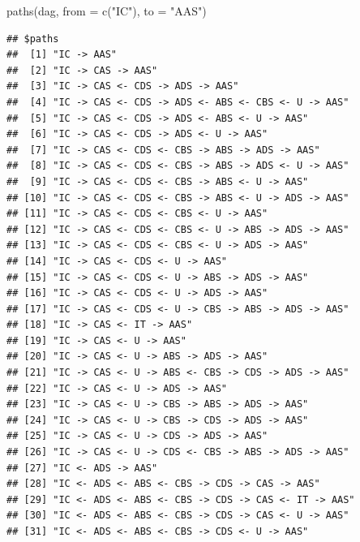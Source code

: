 \documentclass[
  10pt,
  dvipsnames, enabledeprecatedfontcommands]{scrartcl}
\newenvironment{Shaded}{\begin{snugshade}}{\end{snugshade}}
\newcommand{\AttributeTok}[1]{\textcolor[rgb]{0.77,0.63,0.00}{#1}}
\newcommand{\FunctionTok}[1]{\textcolor[rgb]{0.00,0.00,0.00}{#1}}
\newcommand{\NormalTok}[1]{#1}
\newcommand{\StringTok}[1]{\textcolor[rgb]{0.31,0.60,0.02}{#1}}
\begin{document}
\vspace{1mm}
\footnotesize

\begin{Shaded}
\begin{Highlighting}[]
\FunctionTok{paths}\NormalTok{(dag, }\AttributeTok{from =} \FunctionTok{c}\NormalTok{(}\StringTok{"IC"}\NormalTok{), }\AttributeTok{to =} \StringTok{"AAS"}\NormalTok{)}
\end{Highlighting}
\end{Shaded}

\begin{verbatim}
## $paths
##  [1] "IC -> AAS"                                              
##  [2] "IC -> CAS -> AAS"                                       
##  [3] "IC -> CAS <- CDS -> ADS -> AAS"                         
##  [4] "IC -> CAS <- CDS -> ADS <- ABS <- CBS <- U -> AAS"      
##  [5] "IC -> CAS <- CDS -> ADS <- ABS <- U -> AAS"             
##  [6] "IC -> CAS <- CDS -> ADS <- U -> AAS"                    
##  [7] "IC -> CAS <- CDS <- CBS -> ABS -> ADS -> AAS"           
##  [8] "IC -> CAS <- CDS <- CBS -> ABS -> ADS <- U -> AAS"      
##  [9] "IC -> CAS <- CDS <- CBS -> ABS <- U -> AAS"             
## [10] "IC -> CAS <- CDS <- CBS -> ABS <- U -> ADS -> AAS"      
## [11] "IC -> CAS <- CDS <- CBS <- U -> AAS"                    
## [12] "IC -> CAS <- CDS <- CBS <- U -> ABS -> ADS -> AAS"      
## [13] "IC -> CAS <- CDS <- CBS <- U -> ADS -> AAS"             
## [14] "IC -> CAS <- CDS <- U -> AAS"                           
## [15] "IC -> CAS <- CDS <- U -> ABS -> ADS -> AAS"             
## [16] "IC -> CAS <- CDS <- U -> ADS -> AAS"                    
## [17] "IC -> CAS <- CDS <- U -> CBS -> ABS -> ADS -> AAS"      
## [18] "IC -> CAS <- IT -> AAS"                                 
## [19] "IC -> CAS <- U -> AAS"                                  
## [20] "IC -> CAS <- U -> ABS -> ADS -> AAS"                    
## [21] "IC -> CAS <- U -> ABS <- CBS -> CDS -> ADS -> AAS"      
## [22] "IC -> CAS <- U -> ADS -> AAS"                           
## [23] "IC -> CAS <- U -> CBS -> ABS -> ADS -> AAS"             
## [24] "IC -> CAS <- U -> CBS -> CDS -> ADS -> AAS"             
## [25] "IC -> CAS <- U -> CDS -> ADS -> AAS"                    
## [26] "IC -> CAS <- U -> CDS <- CBS -> ABS -> ADS -> AAS"      
## [27] "IC <- ADS -> AAS"                                       
## [28] "IC <- ADS <- ABS <- CBS -> CDS -> CAS -> AAS"           
## [29] "IC <- ADS <- ABS <- CBS -> CDS -> CAS <- IT -> AAS"     
## [30] "IC <- ADS <- ABS <- CBS -> CDS -> CAS <- U -> AAS"      
## [31] "IC <- ADS <- ABS <- CBS -> CDS <- U -> AAS"             

\end{verbatim}
\end{document}
